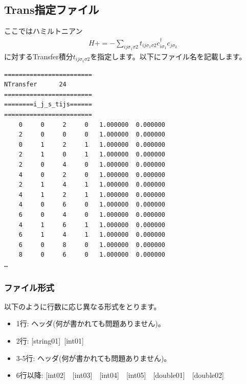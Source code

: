 \subsection{Trans指定ファイル}
\label{Subsec:Trans}
ここではハミルトニアン
\begin{align}
H +=-\sum_{ij\sigma_1\sigma2} t_{ij\sigma_1\sigma2}c_{i\sigma_1}^{\dag}c_{j\sigma_2}
\end{align}
に対するTransfer積分$t_{ij\sigma_1\sigma2}$を指定します。以下にファイル名を記載します。\\
\begin{minipage}{12.5cm}
\begin{screen}
\begin{verbatim}
======================== 
NTransfer      24  
======================== 
========i_j_s_tijs====== 
======================== 
    0     0     2     0   1.000000  0.000000
    2     0     0     0   1.000000  0.000000
    0     1     2     1   1.000000  0.000000
    2     1     0     1   1.000000  0.000000
    2     0     4     0   1.000000  0.000000
    4     0     2     0   1.000000  0.000000
    2     1     4     1   1.000000  0.000000
    4     1     2     1   1.000000  0.000000
    4     0     6     0   1.000000  0.000000
    6     0     4     0   1.000000  0.000000
    4     1     6     1   1.000000  0.000000
    6     1     4     1   1.000000  0.000000
    6     0     8     0   1.000000  0.000000
    8     0     6     0   1.000000  0.000000
…
\end{verbatim}
\end{screen}
\end{minipage}

\subsubsection{ファイル形式}
以下のように行数に応じ異なる形式をとります。
 \begin{itemize}
   \item  1行:  ヘッダ(何が書かれても問題ありません)。
   \item  2行:   [string01]~[int01]
   \item  3-5行:  ヘッダ(何が書かれても問題ありません)。
   \item  6行以降: [int02]~~[int03]~~[int04]~~[int05]~~[double01]~~[double02] 
  \end{itemize}
